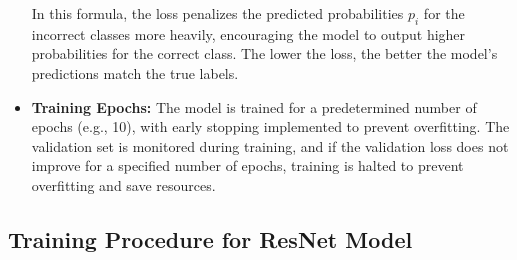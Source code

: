 \documentclass{article}
\begin{document}
\begin{itemize}
In this formula, the loss penalizes the predicted probabilities \( p_i \) for the incorrect classes more heavily, encouraging the model to output higher probabilities for the correct class. The lower the loss, the better the model's predictions match the true labels.


    \item \textbf{Training Epochs:} The model is trained for a predetermined number of epochs (e.g., 10), with early stopping implemented to prevent overfitting. The validation set is monitored during training, and if the validation loss does not improve for a specified number of epochs, training is halted to prevent overfitting and save resources.
\end{itemize}

\subsection{Training Procedure for ResNet Model}
\end{document}
